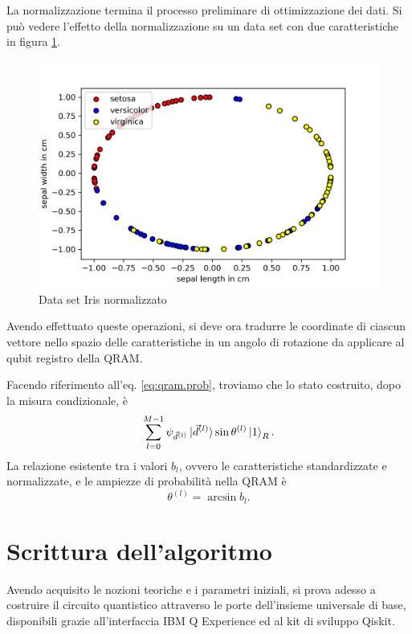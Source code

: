 La normalizzazione termina il processo preliminare di ottimizzazione 
dei dati. Si può vedere l'effetto della normalizzazione su un data set 
con due caratteristiche in figura \ref{fig:iris_normal}. 

\begin{figure}[ht]
    \centering
    \includegraphics[width=\linewidth]{gfx/iris/irisnormalized}
    \caption{Data set Iris normalizzato}
    \label{fig:iris_normal}
\end{figure}

Avendo effettuato queste operazioni, si deve ora tradurre le coordinate 
di ciascun vettore nello spazio delle caratteristiche in un angolo di rotazione 
da applicare al qubit registro della \ac{QRAM}. 

Facendo riferimento all'eq. \ref{eq:qram.prob}, troviamo che lo stato costruito, 
dopo la misura condizionale, è 
\begin{equation}
    \sum_{l=0}^{M-1} \psi_{\vec{d}^{(l)}}\ket{\vec{d}^{(l)}}\sin\theta^{(l)}\ket{1}_R. 
\end{equation}
La relazione esistente tra i valori $b_l$, ovvero le caratteristiche standardizzate e normalizzate, 
e le ampiezze di probabilità nella \ac{QRAM} è 
\begin{equation}
    \theta^{(l)} = \arcsin b_l. 
\end{equation}

\section{Scrittura dell'algoritmo}

Avendo acquisito le nozioni teoriche e i parametri iniziali, si prova 
adesso a costruire il circuito quantistico attraverso le porte 
dell'insieme universale di base, disponibili grazie all'interfaccia IBM 
Q Experience ed al kit di sviluppo Qiskit. 

